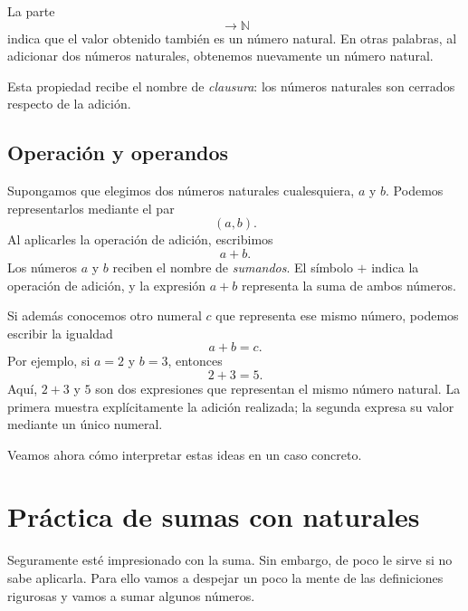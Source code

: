 La parte
\[
\to\mathbb{N}
\]
indica que el valor obtenido también es un número natural. En otras palabras, al adicionar dos números naturales, obtenemos nuevamente un número natural.

Esta propiedad recibe el nombre de \emph{clausura}: los números naturales son cerrados respecto de la adición.

\subsection{Operación y operandos}

Supongamos que elegimos dos números naturales cualesquiera, \(a\) y \(b\). Podemos representarlos mediante el par
\[
(a,b).
\]
Al aplicarles la operación de adición, escribimos
\[
a+b.
\]
Los números \(a\) y \(b\) reciben el nombre de \emph{sumandos}. El símbolo \(+\) indica la operación de adición, y la expresión \(a+b\) representa la suma de ambos números.

Si además conocemos otro numeral \(c\) que representa ese mismo número, podemos escribir la igualdad
\[
a+b=c.
\]
Por ejemplo, si \(a=2\) y \(b=3\), entonces
\[
2+3=5.
\]
Aquí, \(2+3\) y \(5\) son dos expresiones que representan el mismo número natural. La primera muestra explícitamente la adición realizada; la segunda expresa su valor mediante un único numeral.

Veamos ahora cómo interpretar estas ideas en un caso concreto.

\section{Práctica de sumas con naturales}

Seguramente esté impresionado con la suma. Sin embargo, de poco le sirve si no sabe aplicarla. Para ello vamos a despejar un poco la mente de las definiciones rigurosas y vamos a sumar algunos números.

